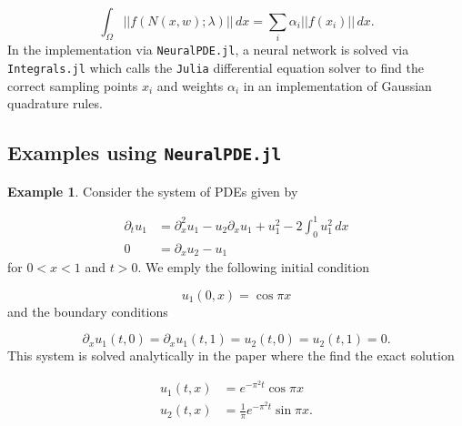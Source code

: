 \documentclass{CUP-JNL-DTM}%
\theoremstyle{definition}
\newtheorem{example}[theorem]{Example}
\numberwithin{equation}{section}
\newcommand{\Julia}{\texttt{Julia} }
\begin{document}
\begin{equation}
	\int_{\Omega} ||f(N(x,w); \lambda)||\,dx = \sum_i \alpha_i ||f(x_i)||\,dx.
\end{equation}
In the implementation via \texttt{NeuralPDE.jl}, a neural network is solved via \texttt{Integrals.jl} which calls the \Julia differential equation solver \cite{rackauckasDifferentialEquationsJlPerformant2017} to find the correct sampling points $x_i$ and weights $\alpha_i$ in an implementation of Gaussian quadrature rules. 

\subsection{Examples using \texttt{NeuralPDE.jl}}

\begin{example}

Consider the system of PDEs given by 

\begin{equation}
    \begin{split}
        \partial_t u_1 & = \partial_x^2 u_1 - u_2 \partial_x u_1 + u_1^2 - 2\int_0^1 u_1^2 \,dx \\
        0 & = \partial_x u_2 - u_1
    \end{split}
\end{equation}
for $0 < x < 1$ and $t > 0$. We emply the following initial condition

\begin{equation}
    u_1(0,x) = \cos \pi x
\end{equation}
and the boundary conditions

\begin{equation}
    \partial_x u_1(t,0) = \partial_x u_1(t,1) = u_2(t,0) = u_2(t,1) = 0. 
\end{equation}
This system is solved analytically in the paper \cite{benhammoudaAnalyticalSolutionsSystems2014} where the find the exact solution

\begin{equation}
    \begin{split}
        u_1(t,x) & = e^{-\pi^2t}\cos \pi x \\
        u_2(t,x) & = \frac{1}{\pi}e^{-\pi^2t} \sin \pi x. 
    \end{split}
\end{equation}

\end{example}
\end{document}

